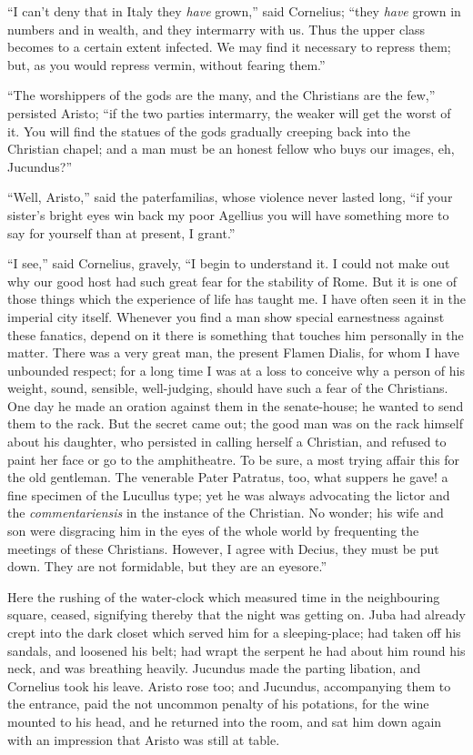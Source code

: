 ``I can't deny that in Italy they \emph{have} grown,'' said
Cornelius; ``they \emph{have} grown in numbers and in wealth, and
they intermarry with us. Thus the upper class becomes to a certain
extent infected. We may find it necessary to repress them; but, as you
would repress vermin, without fearing them.''

``The worshippers of the gods are the many, and the Christians
are the few,'' persisted Aristo; ``if the two parties
intermarry, the weaker will get the worst of it. You will find the
statues of the gods gradually creeping back into the Christian chapel;
and a man must be an honest fellow who buys our images, eh, Jucundus?''

``Well, Aristo,'' said the paterfamilias, whose violence
never lasted long, ``if your sister's bright eyes win back my poor
Agellius you will have something more to say for yourself than at
present, I grant.''

``I see,'' said Cornelius, gravely, ``I begin to
understand it. I could not make out why our good host had such great
fear for the stability of Rome. But it is one of those things which
the experience of life has taught me. I have often seen it in the
imperial city itself. Whenever you find a man show special earnestness
against these fanatics, depend on it there is something that touches
him personally in the matter. There was a very great man, the present
Flamen Dialis, for whom I have unbounded respect; for a long time I
was at a loss to conceive why a person of his weight, sound, sensible,
well-judging, should have such a fear of the Christians. One day he
made an oration against them in the senate-house; he wanted to send
them to the rack. But the secret came out; the good man was on the
rack himself about his daughter, who persisted in calling herself a
Christian, and refused to paint her face or go to the amphitheatre. To
be sure, a most trying affair this for the old gentleman. The
venerable Pater Patratus, too, what suppers he gave! a fine specimen
of the Lucullus type; yet he was always advocating the lictor and the \emph{commentariensis}
in the instance of the Christian. No wonder; his wife and son were
disgracing him in the eyes of the whole world by frequenting the
meetings of these Christians. However, I agree with Decius, they must
be put down. They are not formidable, but they are an eyesore.''

Here the rushing of the water-clock which measured time in the
neighbouring square, ceased, signifying thereby that the night
was getting on. Juba had already crept into the dark closet which
served him for a sleeping-place; had taken off his sandals, and
loosened his belt; had wrapt the serpent he had about him round his
neck, and was breathing heavily. Jucundus made the parting libation,
and Cornelius took his leave. Aristo rose too; and Jucundus,
accompanying them to the entrance, paid the not uncommon penalty of
his potations, for the wine mounted to his head, and he returned into
the room, and sat him down again with an impression that Aristo was
still at table.

